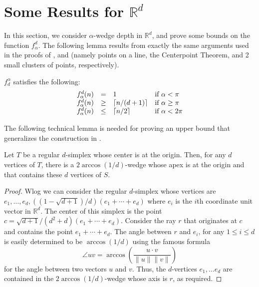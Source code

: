 \documentclass[lotsofwhite]{patmorin}
\begin{document}
\section{Some Results for $\mathbb{R}^d$}

In this section, we consider $\alpha$-wedge depth in $\mathbb{R}^d$,
and prove  some bounds on the function $f^d_\alpha$.  The following
lemma results from exactly the same arguments used in the proofs of
,  and  (namely points on a line, the
Centerpoint Theorem, and 2 small clusters of points, respectively).

\begin{lem}
$f^\alpha_d$ satisfies the following:
\[\begin{array}{lcll}
  f^d_\alpha(n) & = & 1 & \mbox{if $\alpha < \pi$} \\
  f^d_\alpha(n) & \ge & \left\lceil n/(d+1) \right\rceil & \mbox{if $\alpha \ge \pi$} \\
  f^d_\alpha(n) & \le & \left\lceil n/2 \right\rceil & \mbox{if $\alpha < 2\pi$} \\
\end{array}\]
\end{lem}

The following technical lemma is needed for proving an upper bound
that generalizes the construction in .

\begin{lem}
Let $T$ be a regular $d$-simplex whose center is at the origin.  Then,
for any $d$ vertices of $T$, there is a $2\arccos(1/d)$-wedge whose
apex is at the origin and that contains these $d$ vertices of $S$.
\end{lem}

\begin{proof} 
Wlog we can consider the regular $d$-simplex whose vertices are
$e_1,\ldots,e_d, ((1-\sqrt{d+1})/d)(e_1+\cdots+e_d)$ where $e_i$ is the
$i$th coordinate unit vector in $\mathbb{R}^d$.  The center of this
simplex is the point $c=\sqrt{d+1}/(d^2+d)(e_1+\cdots+ e_d)$.
Consider the ray $r$ that originates at $c$ and
contains the point $e_1+\cdots+e_d$.  The angle between $r$ and
$e_i$, for any $1\le i\le d$ is easily determined to be
$\arccos(1/d)$ using the famous formula 
\[
   \angle uv = \arccos \left(\frac{u\cdot v}{\|u\|\|v\|}\right) 
\]
for the angle between two vectors $u$ and $v$.   Thus,
the $d$-vertices $e_1,\ldots e_d$ are contained in the
$2\arccos(1/d)$-wedge whose axis is $r$, as required.
\end{proof}
\end{document}
